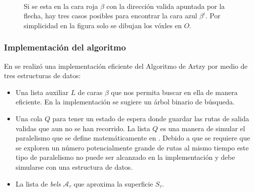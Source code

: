 \begin{figure}[htp]
\begin{center}
     \\
  \end{center}
  \caption[Cambio de caras en el Algoritmo de Artzy]{Si se esta en la cara roja $\beta$ con la dirección valida apuntada por la flecha, hay tres casos posibles para encontrar la cara azul $\beta^i$. Por simplicidad en la figura solo se dibujan los vóxles en $O$.}
  \label{fig:artzyCasos}
\end{figure}

\subsubsection{Implementación del algoritmo}

En \cite{LargeSoftware} se realizó una implementación eficiente del Algoritmo de Artzy por medio de tres estructuras de datos:
\begin{itemize}
  \item Una lista auxiliar $L$ de caras $\beta$ que nos permita buscar en ella de manera eficiente. En la implementación se sugiere un árbol binario de búsqueda.
  \item Una cola $Q$ para tener un estado de espera donde guardar las rutas de salida validas que aun no se han recorrido. La lista $Q$ es una manera de simular el paralelismo que se define matemáticamente en \cite{Gabor:DigitalSpaces}. Debido a que se requiere que se exploren un número potencialmente grande de rutas al mismo tiempo este tipo de paralelismo no puede ser alcanzado en la implementación y debe simularse con una estructura de datos.
  \item La lista de \emph{bels} $\mathcal{A}_{\tau}$ que aproxima la superficie $S_{\tau}$.
\end{itemize}


